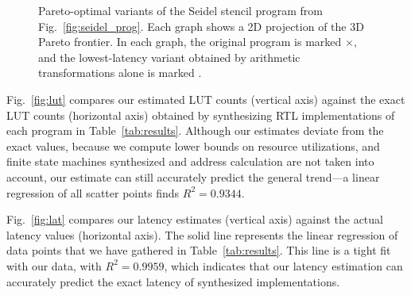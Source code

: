 \begin{figure*}[t]
    \caption{%
        Pareto-optimal variants of the Seidel stencil program from
        Fig.~\ref{fig:seidel_prog}. Each graph shows a 2D projection of the
        3D Pareto frontier. In each graph, the original program is marked
        $\times$, and the lowest-latency variant obtained by arithmetic
        transformations alone is marked \protect\redcircle.}
    \label{fig:seidel}
\end{figure*}

Fig.~\ref{fig:lut} compares our estimated LUT counts (vertical axis)
against the exact LUT counts (horizontal axis) obtained by synthesizing RTL
implementations of each program in Table~\ref{tab:results}.  Although our
estimates deviate from the exact values, because we compute lower bounds on
resource utilizations, and finite state machines synthesized and address
calculation are not taken into account, our estimate can still accurately
predict the general trend---a linear regression of all scatter points finds
$R^2 = 0.9344$.

Fig.~\ref{fig:lat} compares our latency estimates (vertical axis)
against the actual latency values (horizontal axis). The solid line
represents the linear regression of data points that we have gathered in
Table~\ref{tab:results}. This line is a tight fit with our data, with $R^2 =
0.9959$, which indicates that our latency estimation can accurately predict the
exact latency of synthesized implementations.

